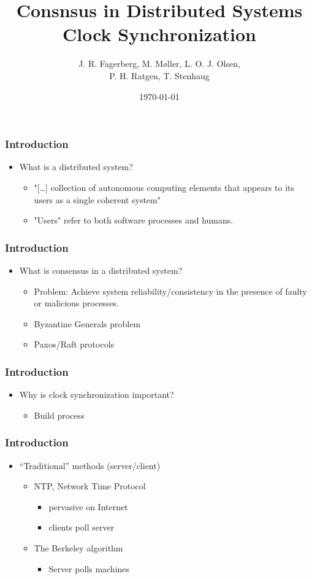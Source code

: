 \documentclass{beamer}
\title{Consnsus in Distributed Systems \\ Clock Synchronization}
\author{J. R. Fagerberg, M. Møller, L. O. J. Olsen,\\ P. H. Ratgen, T. Stenhaug}
\institute{IMADA}
\date{\today}
\begin{document}
 
\frame{\titlepage}
 
\begin{frame}
  \frametitle{Introduction}
  \begin{itemize}
  \item<1-> What is a distributed system?
    \begin{itemize}
    \item<2-> "[\ldots{}] collection of autonomous computing elements that appears to
      its users as a single coherent system" \cite{TanenbaumSteen06}
    \item<3-> "Users" refer to both software processes and humans.
    \end{itemize}
  \end{itemize}
\end{frame}

\begin{frame}
  \frametitle{Introduction}
  \begin{itemize}
  \item<1-> What is consensus in a distributed system?
    \begin{itemize}
    \item<2-> Problem: Achieve system reliability/consistency in the presence of
      faulty or malicious processes.
    \item<3-> Byzantine Generals problem
    \item<4-> Paxos/Raft protocols
    \end{itemize}
  \end{itemize}
\end{frame}
\begin{frame}
  \frametitle{Introduction}
  \begin{itemize}
  \item<1-> Why is clock synchronization important?
    \begin{itemize}
    \item<2-> Build process
    \end{itemize}
  \end{itemize}
\end{frame}

\begin{frame}
  \frametitle{Introduction}
  \begin{itemize}
  \item<1-> ``Traditional'' methods (server/client)
    \begin{itemize}
    \item<2-> NTP, Network Time Protocol
      \begin{itemize}
      \item<3-> pervasive on Internet
      \item<4-> clients poll server
      \end{itemize}
    \item<5-> The Berkeley algorithm
      \begin{itemize}
      \item<6-> Server polls machines
      \end{itemize}
    \end{itemize}
  \end{itemize}
\end{frame}
\end{document}
